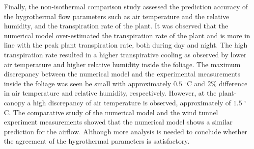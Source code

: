 Finally, the non-isothermal comparison study assessed the prediction accuracy of the hygrothermal flow parameters such as air temperature and the relative humidity, and the transpiration rate of the plant. It was observed that the numerical model over-estimated the transpiration rate of the plant and is more in line with the peak plant transpiration rate, both during day and night. The high transpiration rate resulted in a higher transpirative cooling as observed by lower air temperature and higher relative humidity inside the foliage. The maximum discrepancy between the numerical model and the experimental measurements inside the foliage was seen be small with approximately $0.5$ $^{\circ}$C and $2\%$ difference in air temperature and relative humidity, respectively. However, at the plant-canopy a  high discrepancy of air temperature is observed, approximately of $1.5$ $^{\circ}$C. The comparative study of the numerical model and the wind tunnel experiment measurements showed that the numerical model shows a similar prediction for the airflow. Although more analysis is needed to conclude whether the agreement of the hygrothermal parameters is satisfactory.